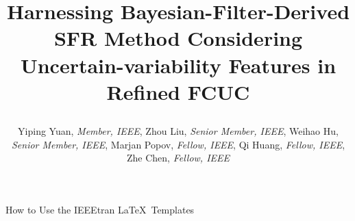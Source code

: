 \documentclass[lettersize,journal]{IEEEtran}
\begin{document}
% 


\vspace{-2.5in}

\title{ \vspace{-0.5em}

	{\selectfont \fontsize{20}{20}\selectfont Harnessing Bayesian-Filter-Derived SFR Method Considering Uncertain-variability Features in Refined FCUC} }
\vspace{-2.5in}

\author{\fontsize{11}{8} \selectfont Yiping Yuan, \textit{Member, IEEE}, Zhou Liu, \textit{Senior Member, IEEE}, Weihao Hu, \textit{Senior Member, IEEE},  Marjan Popov, \textit{Fellow, IEEE}, Qi
	Huang, \textit{Fellow, IEEE}, Zhe Chen, \textit{Fellow, IEEE} \vspace{-2.5em}}

%
{How to Use the IEEEtran \LaTeX \ Templates}
\end{document}
